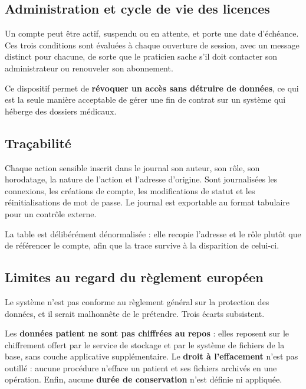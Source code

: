\subsection{Administration et cycle de vie des licences}

Un compte peut être actif, suspendu ou en attente, et porte une date d'échéance. Ces trois
conditions sont évaluées à chaque ouverture de session, avec un message distinct pour chacune,
de sorte que le praticien sache s'il doit contacter son administrateur ou renouveler son
abonnement.

Ce dispositif permet de \textbf{révoquer un accès sans détruire de données}, ce qui est la
seule manière acceptable de gérer une fin de contrat sur un système qui héberge des dossiers
médicaux.



\subsection{Traçabilité}

Chaque action sensible inscrit dans le journal son auteur, son rôle, son horodatage, la nature
de l'action et l'adresse d'origine. Sont journalisées les connexions, les créations de compte,
les modifications de statut et les réinitialisations de mot de passe. Le journal est exportable
au format tabulaire pour un contrôle externe.

La table est délibérément dénormalisée : elle recopie l'adresse et le rôle plutôt que de
référencer le compte, afin que la trace survive à la disparition de celui-ci.


\subsection{Limites au regard du règlement européen}

Le système n'est pas conforme au règlement général sur la protection des données, et il serait
malhonnête de le prétendre. Trois écarts subsistent.

Les \textbf{données patient ne sont pas chiffrées au repos} : elles reposent sur le chiffrement
offert par le service de stockage et par le système de fichiers de la base, sans couche
applicative supplémentaire. Le \textbf{droit à l'effacement} n'est pas outillé : aucune
procédure n'efface un patient et ses fichiers archivés en une opération. Enfin, aucune
\textbf{durée de conservation} n'est définie ni appliquée.

